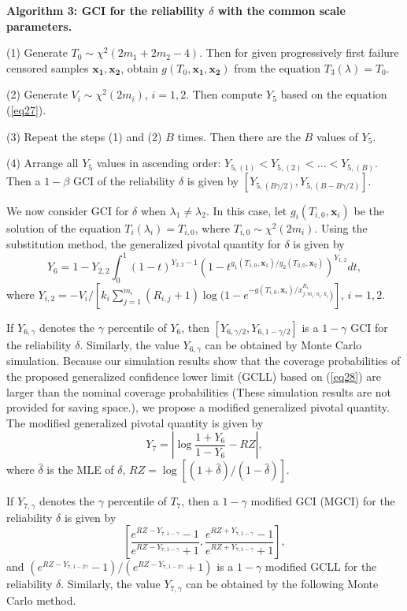 \documentclass[12pt]{article}
\begin{document}
{\bf Algorithm 3: GCI for the reliability $\delta$ with the common scale parameters.}

(1) Generate $T_0 \sim \chi^2(2m_1+2m_2-4)$. Then for given progressively first failure censored samples $\mathbf{x_1}, \mathbf{x_2}$, obtain $g(T_0,\mathbf{x_1}, \mathbf{x_2})$ from the equation $T_3(\lambda)=T_0$.

(2) Generate $V_i \sim \chi^2(2m_i)$, $i=1,2$. Then compute $Y_5$ based on the equation (\ref{eq27}).

(3) Repeat the steps (1) and (2) $B$ times. Then there are the $B$ values of $Y_5$.

(4) Arrange all $Y_5$ values in ascending order: $Y_{5,(1)}<Y_{5,(2)}<...<Y_{5,(B)}$. Then a $1-\beta$ GCI of the reliability $\delta$ is given by $[Y_{5,(B\gamma/2)}, Y_{5,(B-B\gamma/2)}]$.

We now consider GCI for $\delta$ when $\lambda_1\neq \lambda_2$. In this case, let $g_i(T_{i,0},\textbf{x}_i)$ be
the solution of the equation $T_i(\lambda_i)=T_{i,0}$, where $T_{i,0}\sim \chi^2(2m_i)$. Using the substitution method, the generalized pivotal quantity for $\delta$ is given by
\begin{equation}\label{eq28}
Y_6=1-Y_{2,2} \int_0^1(1-t)^{Y_{2,2}-1}(1-t^{g_1(T_{1,0},\textbf{x}_1)/g_2(T_{2,0},\textbf{x}_2)})^{Y_{1,2}}dt,
\end{equation}
where $Y_{i,2}=-V_i/[k_i\sum_{j=1}^{m_i}(R_{i,j}+1)\log({1-e^{{-g(T_{i,0},\textbf{x}_i)}/{x_{j:m_i:n_i:k_i}^{R_i}}})}]$, $i=1,2$.

If $Y_{6,\gamma}$ denotes the $\gamma$ percentile of $Y_6$, then $[Y_{6,\gamma/2}, Y_{6,1-\gamma/2}]$ is a $1-\gamma$ GCI for the reliability $\delta$. Similarly, the value $Y_{6,\gamma}$ can be obtained by Monte Carlo simulation. Because our simulation results show that the coverage probabilities of the proposed generalized confidence lower limit (GCLL) based on (\ref{eq28}) are larger than the nominal coverage probabilities (These simulation results are not provided for saving space.), we propose a modified generalized pivotal quantity. The modified generalized pivotal quantity is given by $$Y_7=\left|\log \frac{1+Y_6}{1-Y_6}-RZ\right|,$$
where $\widehat{\delta}$ is the MLE of $\delta$, $RZ=\log[(1+\widehat{\delta})/(1-\widehat{\delta})]$.

If $Y_{7,\gamma}$ denotes the $\gamma$ percentile of $T_7$, then a $1-\gamma$ modified GCI (MGCI) for the reliability $\delta$ is given by $$\left[\frac{e^{RZ-Y_{7,1-\gamma}}-1}{e^{RZ-Y_{7,1-\gamma}}+1}, \frac{e^{RZ+Y_{7,1-\gamma}}-1}{e^{RZ+Y_{7,1-\gamma}}+1}\right],$$ and $(e^{RZ-Y_{7,1-2\gamma}}-1)/(e^{RZ-Y_{7,1-2\gamma}}+1)$ is a $1-\gamma$ modified GCLL for the reliability $\delta$. Similarly, the value $Y_{7,\gamma}$ can be obtained by the following Monte Carlo method.
\end{document}
